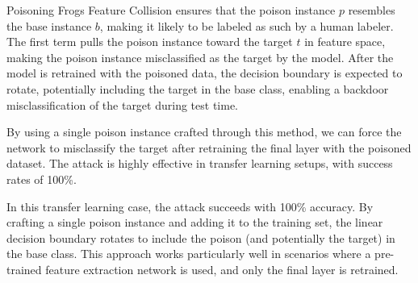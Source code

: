 Poisoning Frogs Feature Collision ensures that the poison instance $p$ resembles the base instance $b$, making it likely to be labeled as such by a human labeler. The first term pulls the poison instance toward the target $t$ in feature space, making the poison instance misclassified as the target by the model. After the model is retrained with the poisoned data, the decision boundary is expected to rotate, potentially including the target in the base class, enabling a backdoor misclassification of the target during test time.

By using a single poison instance crafted through this method, we can force the network to misclassify the target after retraining the final layer with the poisoned dataset. The attack is highly effective in transfer learning setups, with success rates of 100\%.

In this transfer learning case, the attack succeeds with 100\% accuracy. By crafting a single poison instance and adding it to the training set, the linear decision boundary rotates to include the poison (and potentially the target) in the base class. This approach works particularly well in scenarios where a pre-trained feature extraction network is used, and only the final layer is retrained.


